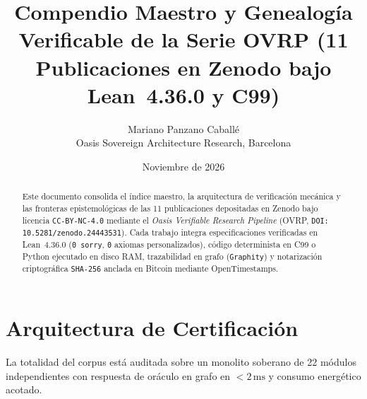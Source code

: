 \documentclass[11pt,a4paper]{article}
\title{Compendio Maestro y Genealog\'ia Verificable de la Serie OVRP (11 Publicaciones en Zenodo bajo Lean~4.36.0 y C99)}
\author{Mariano Panzano Caball\'e \\ \small Oasis Sovereign Architecture Research, Barcelona}
\date{Noviembre de 2026}
\begin{document}
\maketitle

\begin{abstract}
Este documento consolida el \'indice maestro, la arquitectura de verificaci\'on mec\'anica y las fronteras epistemol\'ogicas de las 11 publicaciones depositadas en Zenodo bajo licencia \texttt{CC-BY-NC-4.0} mediante el \emph{Oasis Verifiable Research Pipeline} (OVRP, \texttt{DOI: 10.5281/zenodo.24443531}). Cada trabajo integra especificaciones verificadas en Lean~4.36.0 (\texttt{0 sorry}, \texttt{0} axiomas personalizados), c\'odigo determinista en C99 o Python ejecutado en disco RAM, trazabilidad en grafo (\texttt{Graphity}) y notarizaci\'on criptogr\'afica \texttt{SHA-256} anclada en Bitcoin mediante OpenTimestamps.
\end{abstract}

\section{Arquitectura de Certificaci\'on}
La totalidad del corpus est\'a auditada sobre un monolito soberano de 22 m\'odulos independientes con respuesta de or\'aculo en grafo en $< 2\,\text{ms}$ y consumo energético acotado.
\end{document}
